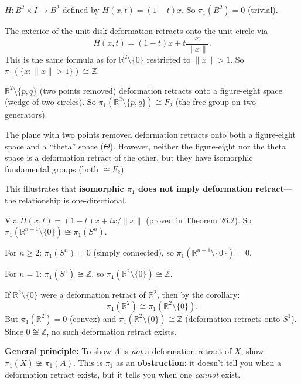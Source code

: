 \documentclass[11pt]{report}
\begin{document}
\begin{exbox}
$H: B^2 \times I \to B^2$ defined by $H(x, t) = (1-t)x$. So $\pi_1(B^2) = 0$ (trivial).
\end{exbox}

\begin{exbox}
The exterior of the unit disk deformation retracts onto the unit circle via
\[H(x, t) = (1-t)x + t\frac{x}{\|x\|}.\]
This is the same formula as for $\mathbb{R}^2 \setminus \{0\}$ restricted to $\|x\| > 1$. So $\pi_1(\{x : \|x\| > 1\}) \cong \mathbb{Z}$.
\end{exbox}

\begin{exbox}
$\mathbb{R}^2 \setminus \{p, q\}$ (two points removed) deformation retracts onto a figure-eight space (wedge of two circles). So $\pi_1(\mathbb{R}^2 \setminus \{p, q\}) \cong F_2$ (the free group on two generators).
\end{exbox}

\begin{exbox}
The plane with two points removed deformation retracts onto both a figure-eight space and a ``theta'' space ($\Theta$). However, neither the figure-eight nor the theta space is a deformation retract of the other, but they have isomorphic fundamental groups (both $\cong F_2$).

This illustrates that \textbf{isomorphic $\pi_1$ does not imply deformation retract}---the relationship is one-directional.
\end{exbox}

\begin{exbox}
Via $H(x,t) = (1-t)x + tx/\|x\|$ (proved in Theorem 26.2). So $\pi_1(\mathbb{R}^{n+1} \setminus \{0\}) \cong \pi_1(S^n)$.

For $n \geq 2$: $\pi_1(S^n) = 0$ (simply connected), so $\pi_1(\mathbb{R}^{n+1} \setminus \{0\}) = 0$.

For $n = 1$: $\pi_1(S^1) \cong \mathbb{Z}$, so $\pi_1(\mathbb{R}^2 \setminus \{0\}) \cong \mathbb{Z}$.
\end{exbox}

\begin{exbox}
If $\mathbb{R}^2 \setminus \{0\}$ were a deformation retract of $\mathbb{R}^2$, then by the corollary:
\[\pi_1(\mathbb{R}^2) \cong \pi_1(\mathbb{R}^2 \setminus \{0\}).\]
But $\pi_1(\mathbb{R}^2) = 0$ (convex) and $\pi_1(\mathbb{R}^2 \setminus \{0\}) \cong \mathbb{Z}$ (deformation retracts onto $S^1$). Since $0 \not\cong \mathbb{Z}$, no such deformation retract exists.

\textbf{General principle:} To show $A$ is \emph{not} a deformation retract of $X$, show $\pi_1(X) \not\cong \pi_1(A)$. This is $\pi_1$ as an \textbf{obstruction}: it doesn't tell you when a deformation retract exists, but it tells you when one \emph{cannot} exist.
\end{exbox}
\end{document}
